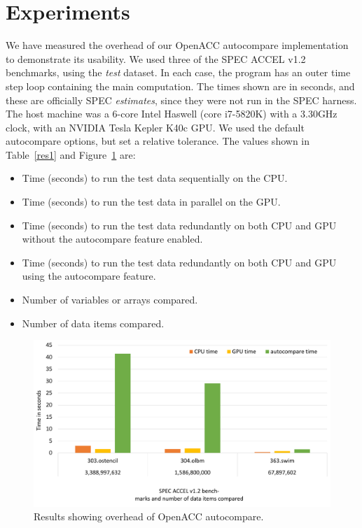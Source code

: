\section{Experiments}

We have measured the overhead of our OpenACC autocompare implementation to demonstrate its usability.
We used three of the SPEC ACCEL v1.2 benchmarks, using the \emph{test} dataset.
In each case, the program has an outer time step loop containing the main computation.
The times shown are in seconds, and these are officially SPEC \emph{estimates}, since they were not run in the SPEC harness.
The host machine was a 6-core Intel Haswell (core i7-5820K) with a 3.30GHz clock, with an NVIDIA Tesla Kepler K40c GPU.
We used the default autocompare options, but set a relative tolerance.
The values shown in Table~\ref{res1} and Figure~\ref{fig:sle_figure} are:
\begin{itemize}
\item Time (seconds) to run the test data sequentially on the CPU.
\item Time (seconds) to run the test data in parallel on the GPU.
\item Time (seconds) to run the test data redundantly on both CPU and GPU without the autocompare feature enabled.
\item Time (seconds) to run the test data redundantly on both CPU and GPU using the autocompare feature.
\item Number of variables or arrays compared.
\item Number of data items compared.
\end{itemize}



\begin{figure}[t]
    \centering
    \includegraphics [width=1\linewidth] {Table1.pdf}
    \caption{Results showing overhead of OpenACC autocompare.}
    \label{fig:sle_figure}
\end{figure}


